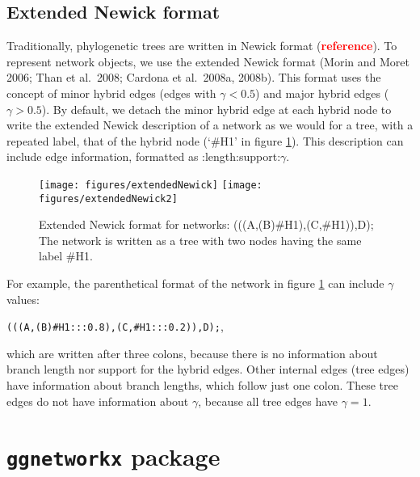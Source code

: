 \documentclass[]{IEEEtran}
\begin{document}
\vspace{-0.25cm}

\hypertarget{extended-newick-format}{%
\subsection{Extended Newick format}\label{extended-newick-format}}

Traditionally, phylogenetic trees are written in Newick format (\textcolor{red}{\textbf{reference}}). To represent network objects, we use the
extended Newick format (Morin and Moret 2006; Than et
al.~2008; Cardona et al.~2008a, 2008b).
This format uses the concept of minor
hybrid edges (edges with \(\gamma < 0.5\)) and major hybrid edges
(\(\gamma > 0.5\)). By default, we detach the minor hybrid edge at each hybrid node to write the extended Newick
description of a network as we would for a tree, with a repeated label, that of the hybrid node (`\#H1' in figure \ref{fig:netNewick}). This description can include edge
information, formatted as :length:support:\(\gamma\).

\begin{figure}

{\centering \texttt{[image: figures/extendedNewick]} \texttt{[image: figures/extendedNewick2]} 

}

\caption{Extended Newick format for networks: (((A,(B)\#H1),(C,\#H1)),D); The network is written as a tree with two nodes having the same label \#H1.}\label{fig:netNewick}
\end{figure}

For example, the parenthetical format of the network in figure \ref{fig:netNewick} can include \(\gamma\) values:

\texttt{(((A,(B)\#H1:::0.8),(C,\#H1:::0.2)),D);},

which are written after three colons, because there is no information about branch length nor support for the hybrid edges. Other internal edges (tree edges) have information about branch lengths, which follow just one colon. These tree edges do not have information about \(\gamma\), because all tree edges have \(\gamma=1\).

\hypertarget{ggnetworkx-package}{%
\section{\texorpdfstring{\texttt{ggnetworkx} package}{ggnetworkx package}}\label{ggnetworkx-package}}
\end{document}
